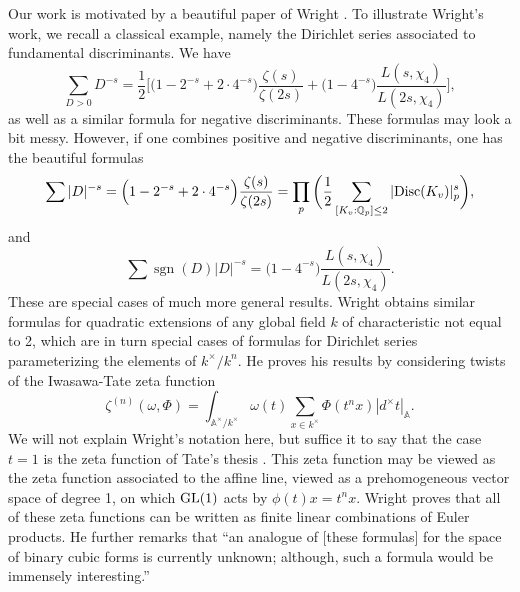 \documentclass[12pt]{amsart}
\theoremstyle{remark}
\numberwithin{theorem}{section} \numberwithin{equation}{section}
\newcommand{\Q}{\mathbb{Q}}
\newcommand{\GL}{{\text {\rm GL}}}
\newcommand{\sgn}{\operatorname{sgn}}
\newcommand{\Disc}{\textnormal{Disc}}
\newcommand{\A}{\mathbb{A}}
\begin{document}
Our work is motivated by a beautiful paper of Wright \cite{W}. To illustrate Wright's work, we recall a
classical example, namely the Dirichlet series associated to fundamental discriminants. We
have
\begin{equation}
\sum_{D > 0} D^{-s} = \frac{1}{2} \bigg[ \big(1 - 2^{-s} + 2 \cdot 4^{-s}\big) \frac{\zeta(s)}{\zeta(2s)} +
\big( 1 - 4^{-s} \big) \frac{L(s, \chi_4)}{L(2s, \chi_4)}\bigg],
\end{equation}
as well as a similar formula for negative discriminants. These formulas may look a bit messy.
However, if one combines positive and negative discriminants, one has the beautiful formulas
\begin{equation}
\sum |D|^{-s} = \Big( 1 - 2^{-s} + 2 \cdot 4^{-s}\Big) \frac{\zeta(s)}{\zeta(2s)} =
\prod_p \bigg( \frac{1}{2} \sum_{[K_v : \Q_p] \leq 2} |\Disc(K_v)|_p^s \bigg),
\end{equation}
and
\begin{equation}
\sum \sgn(D) |D|^{-s} = \Big( 1 - 4^{-s}\Big) \frac{L(s, \chi_4)}{L(2s, \chi_4)}.
\end{equation}
These are special cases of much more general results. Wright obtains similar formulas for quadratic
extensions of any global field $k$ of characteristic not equal to 2, which are in turn special cases of formulas
for Dirichlet series parameterizing the elements of $k^{\times}/k^n$. He proves his results by considering 
twists of the Iwasawa-Tate zeta function
\begin{equation}\label{eqn_it}
\zeta^{(n)}(\omega, \Phi) = \int_{\A^{\times} / k^{\times}} \omega(t) \sum_{x \in k^{\times}} \Phi(t^n x) |d^{\times} t|_{\A}.
\end{equation}
We will not explain Wright's notation here, but suffice it to say that the case $t = 1$ is the zeta function of
Tate's thesis \cite{tate}. This zeta function may be viewed as the zeta function associated to the affine line, viewed as a
prehomogeneous vector space of degree 1, on which $\GL(1)$ acts by $\phi(t) x = t^n x$. Wright proves 
that all of these zeta functions can be written as finite linear combinations of Euler products.
He further remarks that ``an analogue of [these formulas] for the space of binary cubic
forms is currently unknown; although, such a formula would be immensely interesting.''
\end{document}
